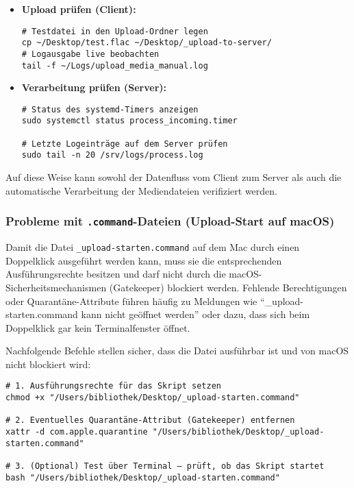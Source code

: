 \documentclass[12pt,a4paper]{report}
\begin{document}
    \begin{itemize}
      \item \textbf{Upload prüfen (Client):}
      \begin{verbatim}
# Testdatei in den Upload-Ordner legen
cp ~/Desktop/test.flac ~/Desktop/_upload-to-server/
# Logausgabe live beobachten
tail -f ~/Logs/upload_media_manual.log
      \end{verbatim}

      \item \textbf{Verarbeitung prüfen (Server):}
      \begin{verbatim}
# Status des systemd-Timers anzeigen
sudo systemctl status process_incoming.timer

# Letzte Logeinträge auf dem Server prüfen
sudo tail -n 20 /srv/logs/process.log
      \end{verbatim}
    \end{itemize}

    Auf diese Weise kann sowohl der Datenfluss vom Client zum Server als auch die automatische Verarbeitung der Mediendateien verifiziert werden.

    \subsubsection*{Probleme mit \texttt{.command}-Dateien (Upload-Start auf macOS)}
    Damit die Datei \texttt{\_upload-starten.command} auf dem Mac durch einen Doppelklick ausgeführt werden kann, 
    muss sie die entsprechenden Ausführungsrechte besitzen und darf nicht durch die macOS-Sicherheitsmechanismen (Gatekeeper) blockiert werden.  
    Fehlende Berechtigungen oder Quarantäne-Attribute führen häufig zu Meldungen wie 
    \enquote{\_upload-starten.command kann nicht geöffnet werden} oder dazu, dass sich beim Doppelklick gar kein Terminalfenster öffnet.  

    Nachfolgende Befehle stellen sicher, dass die Datei ausführbar ist und von macOS nicht blockiert wird:

    \begin{verbatim}
# 1. Ausführungsrechte für das Skript setzen
chmod +x "/Users/bibliothek/Desktop/_upload-starten.command"

# 2. Eventuelles Quarantäne-Attribut (Gatekeeper) entfernen
xattr -d com.apple.quarantine "/Users/bibliothek/Desktop/_upload-starten.command"

# 3. (Optional) Test über Terminal — prüft, ob das Skript startet
bash "/Users/bibliothek/Desktop/_upload-starten.command"
    \end{verbatim}
\end{document}
